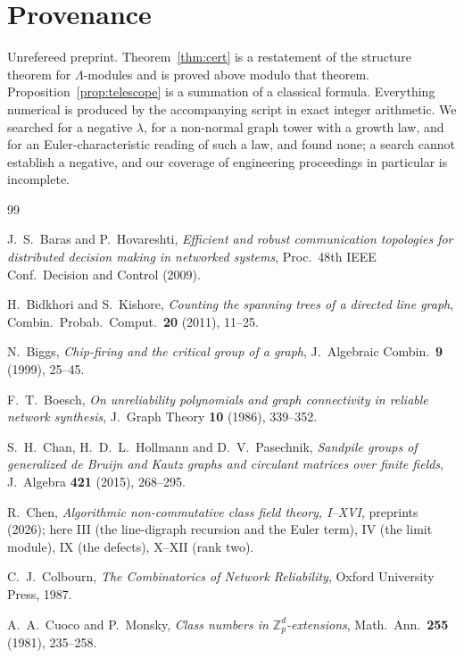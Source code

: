 \documentclass[11pt]{article}
\theoremstyle{plain}
\theoremstyle{remark}
\newcommand{\Z}{\mathbb{Z}}
\newcommand{\La}{\Lambda}
\begin{document}
\section*{Provenance}

Unrefereed preprint. Theorem~\ref{thm:cert} is a restatement of the structure theorem for
$\La$-modules and is proved above modulo that theorem. Proposition~\ref{prop:telescope} is
a summation of a classical formula. Everything numerical is produced by the accompanying
script in exact integer arithmetic. We searched for a negative $\lambda$, for a non-normal
graph tower with a growth law, and for an Euler-characteristic reading of such a law, and
found none; a search cannot establish a negative, and our coverage of engineering
proceedings in particular is incomplete.

\begin{thebibliography}{99}

 J.~S.~Baras and P.~Hovareshti,
\emph{Efficient and robust communication topologies for distributed decision making in
networked systems}, Proc.\ 48th IEEE Conf.\ Decision and Control (2009).

 H.~Bidkhori and S.~Kishore,
\emph{Counting the spanning trees of a directed line graph},
Combin.\ Probab.\ Comput.\ \textbf{20} (2011), 11--25.

 N.~Biggs,
\emph{Chip-firing and the critical group of a graph},
J.\ Algebraic Combin.\ \textbf{9} (1999), 25--45.

 F.~T.~Boesch,
\emph{On unreliability polynomials and graph connectivity in reliable network synthesis},
J.\ Graph Theory \textbf{10} (1986), 339--352.

 S.~H.~Chan, H.~D.~L.~Hollmann and D.~V.~Pasechnik,
\emph{Sandpile groups of generalized de Bruijn and Kautz graphs and circulant matrices over
finite fields}, J.\ Algebra \textbf{421} (2015), 268--295.

 R.~Chen,
\emph{Algorithmic non-commutative class field theory, I--XVI}, preprints (2026);
here III (the line-digraph recursion and the Euler term), IV (the limit module),
IX (the defects), X--XII (rank two).

 C.~J.~Colbourn,
\emph{The Combinatorics of Network Reliability}, Oxford University Press, 1987.

 A.~A.~Cuoco and P.~Monsky,
\emph{Class numbers in $\Z_p^{d}$-extensions},
Math.\ Ann.\ \textbf{255} (1981), 235--258.


\end{thebibliography}
\end{document}
